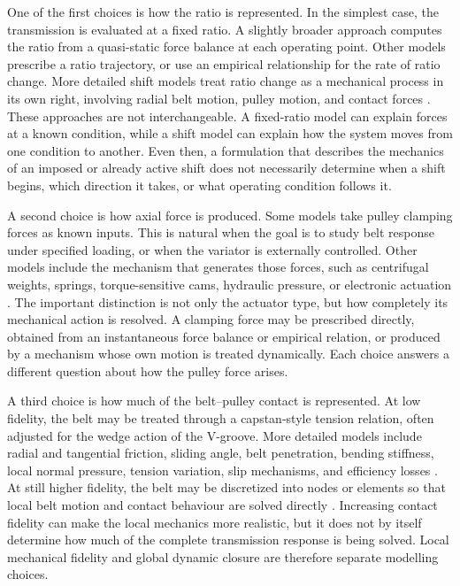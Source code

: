 \documentclass[11pt]{report}
\numberwithin{equation}{section}
\begin{document}
One of the first choices is how the ratio is represented. In the simplest case, the transmission is evaluated at a fixed ratio. A slightly broader approach computes the ratio from a quasi-static force balance at each operating point. Other models prescribe a ratio trajectory, or use an empirical relationship for the rate of ratio change. More detailed shift models treat ratio change as a mechanical process in its own right, involving radial belt motion, pulley motion, and contact forces \citep{KimEtAl2002,Sorge2008,CammalleriSorge2009,SorgeCammalleri2011}. These approaches are not interchangeable. A fixed-ratio model can explain forces at a known condition, while a shift model can explain how the system moves from one condition to another. Even then, a formulation that describes the mechanics of an imposed or already active shift does not necessarily determine when a shift begins, which direction it takes, or what operating condition follows it.

A second choice is how axial force is produced. Some models take pulley clamping forces as known inputs. This is natural when the goal is to study belt response under specified loading, or when the variator is externally controlled. Other models include the mechanism that generates those forces, such as centrifugal weights, springs, torque-sensitive cams, hydraulic pressure, or electronic actuation \citep{Cammalleri2005,KimEtAl2002,Skinner2020,SorgeCammalleri2011}. The important distinction is not only the actuator type, but how completely its mechanical action is resolved. A clamping force may be prescribed directly, obtained from an instantaneous force balance or empirical relation, or produced by a mechanism whose own motion is treated dynamically. Each choice answers a different question about how the pulley force arises.

A third choice is how much of the belt--pulley contact is represented. At low fidelity, the belt may be treated through a capstan-style tension relation, often adjusted for the wedge action of the V-groove. More detailed models include radial and tangential friction, sliding angle, belt penetration, bending stiffness, local normal pressure, tension variation, slip mechanisms, and efficiency losses \citep{Gerbert1996,KimKim1989,Sorge1996,KongParker2005,KongParker2006,ChenLeeSung1998,Bertini2014,Messick2018}. At still higher fidelity, the belt may be discretized into nodes or elements so that local belt motion and contact behaviour are solved directly \citep{JulioPlante2011,Ballew2015}. Increasing contact fidelity can make the local mechanics more realistic, but it does not by itself determine how much of the complete transmission response is being solved. Local mechanical fidelity and global dynamic closure are therefore separate modelling choices.
\end{document}
